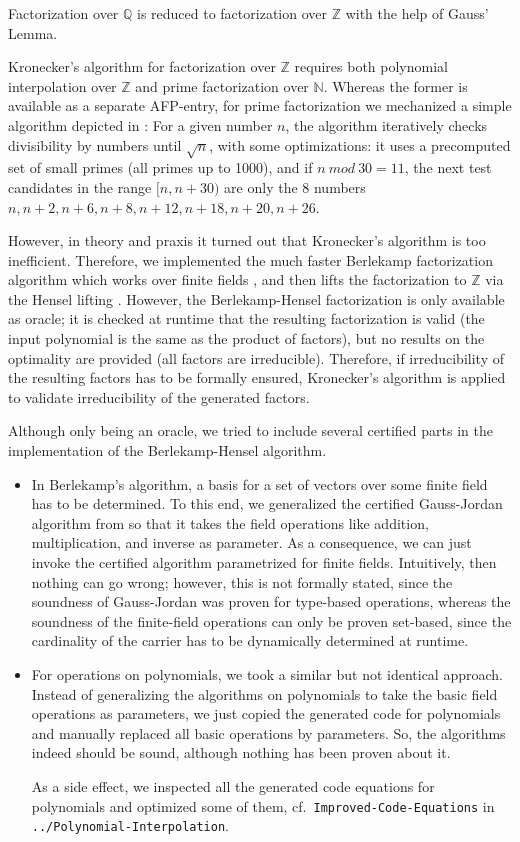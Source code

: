 \documentclass[11pt,a4paper]{article}
\newcommand\rats{\mathbb{Q}}
\newcommand\ints{\mathbb{Z}}
\newcommand\nats{\mathbb{N}}
\newcommand\mod{\mathit{mod}}
\begin{document}
Factorization over $\rats$ is reduced to factorization over $\ints$ 
with the help of Gauss' Lemma.

Kronecker's algorithm for factorization over $\ints$ requires both
polynomial interpolation over $\ints$ and prime factorization over $\nats$. Whereas the former
is available as a separate AFP-entry, for prime factorization we mechanized a simple algorithm depicted
in \cite{Knuth}:
For a given number $n$,
the algorithm iteratively checks divisibility by numbers until $\sqrt n$,
with some optimizations:
it uses a precomputed set of small primes (all primes up to 1000), 
and if $n\ \mod\ 30 = 11$, the next test candidates in the range $[n,n+30)$ 
are only the 8 numbers $n,n+2,n+6,n+8,n+12,n+18,n+20,n+26$.

However, in theory and praxis it turned out that Kronecker's algorithm is too inefficient. 
Therefore, we implemented the much faster Berlekamp factorization algorithm which works over finite fields \cite{Berlekamp}, and
then lifts the factorization to $\ints$ via the Hensel lifting \cite{Hensel}. However, the Berlekamp-Hensel
factorization is only available as oracle; it is checked at runtime that the resulting
factorization is valid (the input polynomial is the same as the product of factors), 
but no results on the optimality are provided (all factors are irreducible). 
Therefore, if irreducibility of the resulting factors has to be formally ensured, 
Kronecker's algorithm is applied to validate irreducibility of the generated factors.

Although only being an oracle, we tried to include several certified parts in the implementation
of the Berlekamp-Hensel algorithm.
\begin{itemize}
\item In Berlekamp's algorithm, a basis for a set of vectors over some finite field has to be determined.
  To this end, we generalized the certified Gauss-Jordan algorithm from \cite{JNF-AFP} so that 
  it takes the field operations like addition, multiplication, and inverse as parameter. 
  As a consequence, we can just invoke the certified algorithm 
  parametrized for finite fields. Intuitively, then nothing can go wrong; however, this is not
  formally stated, since the soundness of Gauss-Jordan was proven for type-based operations, whereas
  the soundness of the finite-field operations can only be proven set-based, since the cardinality of the
  carrier has to be dynamically determined at runtime.
\item For operations on polynomials, we took a similar but not identical approach. Instead of 
  generalizing the algorithms on polynomials to take the basic field operations as parameters, we just
  copied the generated code for polynomials and manually replaced all basic operations by parameters.
  So, the algorithms indeed should be sound, although nothing has been proven about it.
  
  As a side effect, we inspected all the generated code equations for polynomials and optimized some of them,
  cf.\ \texttt{Improved-Code-Equations} in \texttt{../Polynomial-Interpolation}.
\end{itemize}
\end{document}

